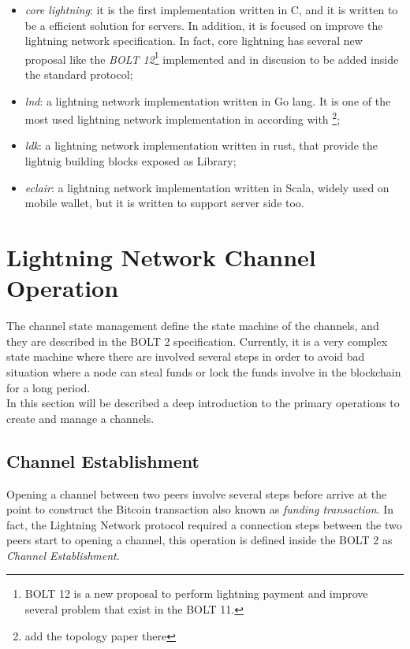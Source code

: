 \begin{itemize}
  \item \emph{core lightning}: it is the first implementation written in C, and it is written
        to be a efficient solution for servers. In addition, it is focused on improve the lightning network specification. In fact, core lightning has several new proposal like the \emph{BOLT 12}\footnote{BOLT 12 is a new proposal to perform
        lightning payment and improve several problem that exist in the BOLT 11.} implemented and in discusion to be
        added inside the standard protocol;
  \item \emph{lnd}: a lightning network implementation written in Go lang. It is one of the most used lightning network implementation in according with \footnote{add the topology paper there};
  \item \emph{ldk}: a lightning network implementation written in rust, that provide the lightnig building blocks exposed as Library;
  \item \emph{eclair}: a lightning network implementation written in Scala, widely used on mobile wallet, but it is written to
        support server side too.
\end{itemize}

\section{Lightning Network Channel Operation}
\label{sec:channel_state}

The channel state management define the state machine of the channels, and they are described in the BOLT 2 specification. Currently, it is a very complex
state machine where there are involved several steps in order to avoid bad
situation where a node can steal funds or lock the funds involve in the blockchain for a long period.\\
In this section will be described a deep introduction to the primary operations to create and manage a channels.

\subsection{Channel Establishment}
\label{sec:open_a_channels}

Opening a channel between two peers involve several steps before arrive at the point to construct the Bitcoin transaction also
known as \emph{funding transaction}.
In fact, the Lightning Network protocol required a connection steps between the two peers start to opening a channel, this
operation is defined inside the BOLT 2\cite{bolt2} as \emph{Channel Establishment}.


